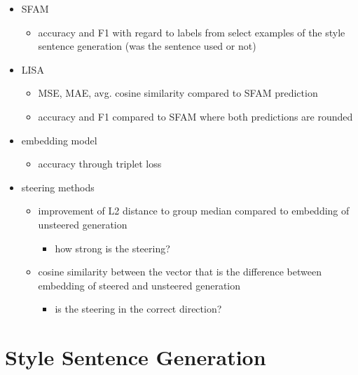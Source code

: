\begin{itemize}
  \item SFAM
        \begin{itemize}
          \item accuracy and F1 with regard to labels from select examples of the style sentence generation (was the sentence used or not)
        \end{itemize}
  \item LISA
        \begin{itemize}
          \item MSE, MAE, avg. cosine similarity compared to SFAM prediction
          \item accuracy and F1 compared to SFAM where both predictions are rounded
        \end{itemize}
  \item embedding model
        \begin{itemize}
          \item accuracy through triplet loss
        \end{itemize}
  \item steering methods
        \begin{itemize}
          \item improvement of L2 distance to group median compared to embedding of unsteered generation
                \begin{itemize}
                  \item how strong is the steering?
                \end{itemize}
          \item cosine similarity between the vector that is the difference between embedding of steered and unsteered generation
                \begin{itemize}
                  \item is the steering in the correct direction?
                \end{itemize}
        \end{itemize}
\end{itemize}


\section{Style Sentence Generation}
\label{sec:approach:styleSentenceGeneration}

